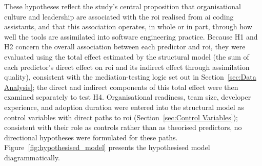 These hypotheses reflect the study's central proposition that organisational culture and leadership are associated with the \gls{roi} realised from \gls{ai} coding assistants, and that this association operates, in whole or in part, through how well the tools are assimilated into software engineering practice. Because H1 and H2 concern the overall association between each predictor and \gls{roi}, they were evaluated using the total effect estimated by the structural model (the sum of each predictor's direct effect on \gls{roi} and its indirect effect through assimilation quality), consistent with the mediation-testing logic set out in Section~\ref{sec:Data Analysis}; the direct and indirect components of this total effect were then examined separately to test H4. Organisational readiness, team size, developer experience, and adoption duration were entered into the structural model as control variables with direct paths to \gls{roi} (Section~\ref{sec:Control Variables}); consistent with their role as controls rather than as theorised predictors, no directional hypotheses were formulated for these paths. Figure~\ref{fig:hypothesised_model} presents the hypothesised model diagrammatically.

			

